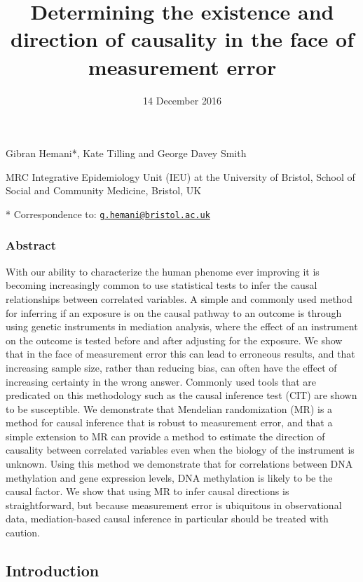 \documentclass[]{article}
\title{Determining the existence and direction of causality in the face of
measurement error}
\author{}
\date{14 December 2016}
\begin{document}
\maketitle

Gibran Hemani*, Kate Tilling and George Davey Smith

MRC Integrative Epidemiology Unit (IEU) at the University of Bristol,
School of Social and Community Medicine, Bristol, UK

* Correspondence to:
\href{mailto:g.hemani@bristol.ac.uk}{\nolinkurl{g.hemani@bristol.ac.uk}}

\subsubsection{Abstract}\label{abstract}

With our ability to characterize the human phenome ever improving it is
becoming increasingly common to use statistical tests to infer the
causal relationships between correlated variables. A simple and commonly
used method for inferring if an exposure is on the causal pathway to an
outcome is through using genetic instruments in mediation analysis,
where the effect of an instrument on the outcome is tested before and
after adjusting for the exposure. We show that in the face of
measurement error this can lead to erroneous results, and that
increasing sample size, rather than reducing bias, can often have the
effect of increasing certainty in the wrong answer. Commonly used tools
that are predicated on this methodology such as the causal inference
test (CIT) are shown to be susceptible. We demonstrate that Mendelian
randomization (MR) is a method for causal inference that is robust to
measurement error, and that a simple extension to MR can provide a
method to estimate the direction of causality between correlated
variables even when the biology of the instrument is unknown. Using this
method we demonstrate that for correlations between DNA methylation and
gene expression levels, DNA methylation is likely to be the causal
factor. We show that using MR to infer causal directions is
straightforward, but because measurement error is ubiquitous in
observational data, mediation-based causal inference in particular
should be treated with caution.

\subsection{Introduction}\label{introduction}
\end{document}
